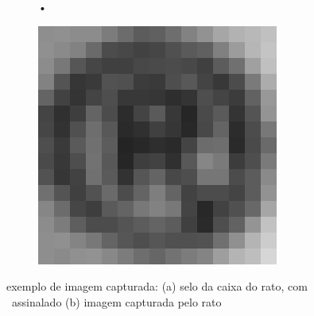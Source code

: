 \documentclass[a4paper]{article}
\begin{document}
\begin{figure}[h]
	\centering
	\begin{subfigure}[b]{0.45\textwidth}
		\centering
		•
		\caption{}
		\label{fig:Cherry_box}
	\end{subfigure}%
	\begin{subfigure}[b]{0.45\textwidth}
		\centering
		\includegraphics[width=\linewidth]{rprintscreen}
		\caption{}
		\label{fig:registed_capture}
	\end{subfigure}
	\caption{exemplo de imagem capturada: (a) selo da caixa do rato, com \textregistered\ assinalado (b) imagem capturada pelo rato}
\end{figure}
\end{document}
